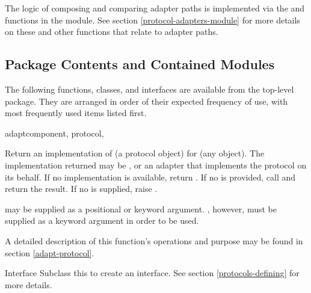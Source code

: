 \begin{verbatim%
}
\begin{verbatim%
}
\begin{verbatim%
}
\begin{verbatim%
}
\begin{verbatim%
}
\begin{verbatim%
}
\begin{seealso}

The logic of composing and comparing adapter paths is implemented via the
 and  functions in the
 module.  See section \ref{protocol-adapters-module}
for more details on these and other functions that relate to adapter paths.


\end{seealso}














\newpage
\subsection{Package Contents and Contained Modules\label{protocols-contents}}

The following functions, classes, and interfaces are available from the
top-level  package.  They are arranged in order of
their expected frequency of use, with most frequently used items listed first.

\begin{funcdesc}{adapt}{component, protocol,
}

Return an implementation of  (a protocol object) for
 (any object).  The implementation returned may be
, or an adapter that implements the protocol on its
behalf.  If no implementation is available, return .  If no
 is provided, call  and return the result.  If no  is supplied,
raise .

 may be supplied as a positional or keyword argument.
, however, must be supplied as a keyword argument in order
to be used.

A detailed description of this function's operations and purpose may be found in
section \ref{adapt-protocol}.
\end{funcdesc}

\begin{classdesc*}{Interface}
Subclass this to create an interface.  See section \ref{protocols-defining}
for more details.
\end{classdesc*}













\end{verbatim%
}
\end{verbatim%
}
\end{verbatim%
}
\end{verbatim%
}
\end{verbatim%
}
\end{verbatim%
}
